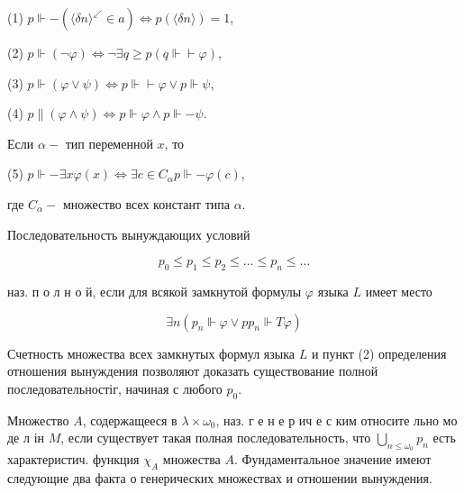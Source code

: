 \documentclass[10pt]{article}
\begin{document}
(1) $p \Vdash-\left(\langle\delta n\rangle^{\swarrow} \in a\right) \Longleftrightarrow p(\langle\delta n\rangle)=1$,



(2) $p \Vdash(\neg \varphi) \Longleftrightarrow \neg \exists q \geqslant p(q \Vdash \vdash \varphi)$,



(3) $p \Vdash(\varphi \vee \psi) \Longleftrightarrow p \Vdash \vdash \varphi \vee p \Vdash \psi$,



(4) $p \|(\varphi \wedge \psi) \Longleftrightarrow p \Vdash \varphi \wedge p \Vdash-\psi$.



Если $\alpha-$ тип переменной $x$, то



(5) $p \Vdash-\exists x \varphi(x) \Longleftrightarrow \exists c \in C_{\alpha} p \Vdash-\varphi(c)$,



где $C_{\alpha}-$ множество всех констант типа $\alpha$.



Последовательность вынуждающих условий



\[

p_{0} \leqslant p_{1} \leqslant p_{2} \leqslant \ldots \leqslant p_{n} \leqslant \ldots

\]



наз. п о л н о й, если для всякой замкнутой формулы $\varphi$ языка $L$ имеет место



\[

\exists n\left(p_{n} \Vdash \varphi \vee p p_{n} \Vdash T \varphi\right)

\]



Счетность множества всех замкнутых формул языка $L$ и пункт (2) определения отношения вынуждения позволяют доказать существование полной последовательностіг, начиная с любого $p_{0}$.



Множество $A$, содержащееся в $\lambda \times \omega_{0}$, наз. г е н е р ич е с ким относите льно мо де л ін $M$, если существует такая полная последовательность, что $\bigcup_{n \leqslant \omega_{0}} p_{n}$ есть характеристич. функция $\chi_{A}$ множества $A$. Фундаментальное значение имеют следующие два факта о генерических множествах и отношении вынуждения.
\end{document}
